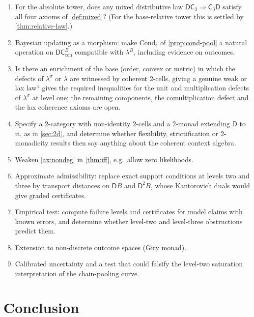 \documentclass[11pt]{article}
\theoremstyle{definition}
\theoremstyle{remark}
\newcommand{\D}{\mathsf{D}}
\newcommand{\Cond}{\mathrm{Cond}}
\newcommand{\C}{\mathsf{C}}
\newcommand{\lb}{\bar\lambda}
\newcommand{\ls}{\lambda^{\sigma}}
\begin{document}
\begin{enumerate}[leftmargin=*]
\item For the absolute tower, does any mixed distributive law $\D\C_3\Rightarrow\C_3\D$ satisfy
  all four axioms of \cref{def:mixed}? (For the base-relative tower this is settled by
  \cref{thm:relative-law}.)
\item Bayesian updating as a morphism: make $\Cond_e$ of \cref{prop:cond-pool} a natural operation
  on $\D\C^B_{\mathrm{coh}}$ compatible with $\lambda^B$, including evidence on outcomes.
\item Is there an enrichment of the base (order, convex or metric) in which the defects of $\ls$ or
  $\lb$ are witnessed by coherent 2-cells, giving a genuine weak or lax law?  gives the
  required inequalities for the unit and multiplication defects of $\ls$ at level one; the remaining
  components, the comultiplication defect and the lax coherence axioms are open.
\item Specify a 2-category with non-identity 2-cells and a 2-monad extending $\D$ to it, as in
  \cref{sec:2d}, and determine whether flexibility, strictification or 2-monadicity results then say
  anything about the coherent context algebra.
\item Weaken \cref{ax:nondeg} in \cref{thm:iff}, e.g.\ allow zero likelihoods.
\item Approximate admissibility: replace exact support conditions at levels two and three by
  transport distances on $\D B$ and $\D^2B$, whose Kantorovich duals would give graded certificates.
\item Empirical test: compute failure levels and certificates for model claims with known errors, and
  determine whether level-two and level-three obstructions predict them.
\item Extension to non-discrete outcome spaces (Giry monad).
\item Calibrated uncertainty and a test that could falsify the level-two saturation interpretation of
  the chain-pooling curve.
\end{enumerate}

\section{Conclusion}
\end{document}
